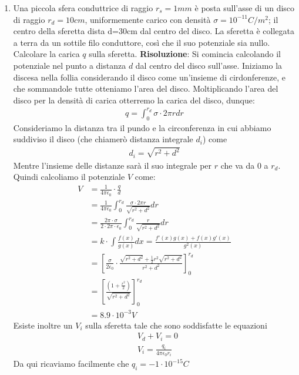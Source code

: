 \documentclass{book}
\begin{document}
\begin{enumerate}
    \item Una piccola sfera conduttrice di raggio $r_s=1mm$ è posta sull'asse di un disco di raggio $r_d=10cm$, uniformemente carico con densità $\sigma=10^{-11}C/m^2$; il centro della sferetta dista d=30cm dal centro del disco. La sferetta è collegata a terra da un sottile filo conduttore, così che il suo potenziale sia nullo. Calcolare la carica $q$ sulla sferetta. \newline
    \textbf{Risoluzione}: Si comincia calcolando il potenziale nel punto a distanza $d$ dal centro del disco sull'asse. Iniziamo la discesa nella follia considerando il disco come un'insieme di cirdonferenze, e che sommandole tutte otteniamo l'area del disco.
    Moltiplicando l'area del disco per la densità di carica otterremo la carica del disco, dunque:
    \begin{align*}
        q = \int_{0}^{r_d}\sigma \cdot 2 \pi r dr 
    \end{align*}
    Consideriamo la distanza tra il pundo e la circonferenza in cui abbiamo suddiviso il disco (che chiamerò distanza integrale $d_i$) come 
    \begin{align*}
        d_i = \sqrt{r^2+d^2}
    \end{align*}
    Mentre l'insieme delle distanze sarà il suo integrale per $r$ che va da $0$ a $r_d$. \newline
    Quindi calcoliamo il potenziale $V$ come:
    \begin{align*}
        V & = \frac{1}{4 \pi \epsilon_0} \cdot \frac{q}{d} \\
          & = \frac{1}{4 \pi \epsilon_0} \int_{0}^{r_d} \frac{\sigma \cdot 2 \pi r}{\sqrt{r^2 + d^2}}dr \\
          & = \frac{2 \pi \cdot \sigma}{2 \cdot 2 \pi \cdot \epsilon_0} \int_{0}^{r_d} \frac{r}{\sqrt{r^2 + d^2}}dr \\
          & = k \cdot \int \frac{f(x)}{g(x)}dx= \frac{f'(x)g(x) + f(x)g'(x)}{g^2(x)} \\
          & = \left[ \frac{\sigma}{2 \epsilon_0} \cdot \frac{\sqrt{r^2+d^2} + \frac{1}{2} r^2 \sqrt{r^2 + d^2}}{r^2 + d^2} \right]_{0}^{r_d}\\
          & = \left[ \frac{\left( 1 + \frac{r^2}{2}\right)}{\sqrt{r^2 + d^2}} \right]_{0}^{r_d} \\
          & = 8.9 \cdot 10^{-3}V
    \end{align*}
    Esiste inoltre un $V_i$ sulla sferetta tale che sono soddisfatte le equazioni
    \begin{align*}
        & V_d + V_i = 0 \\
        & V_i = \frac{q_i}{4 \pi \epsilon_0 r_i}
    \end{align*}
    Da qui ricaviamo facilmente che $q_i = -1 \cdot 10^{-15} C$

\end{enumerate}



\tableofcontents
\end{document}
